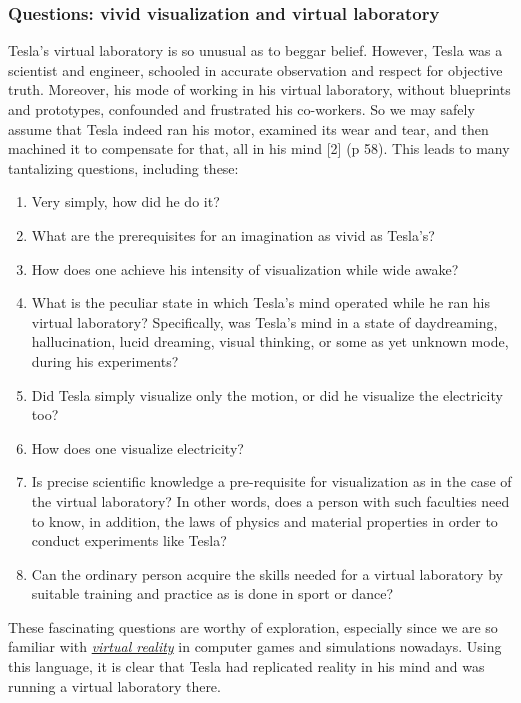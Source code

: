 \documentclass[
  11pt,
  a4paper,
]{article}
\providecommand{\tightlist}{%
  \setlength{\itemsep}{0pt}\setlength{\parskip}{0pt}}
\begin{document}
\hypertarget{questions-vivid-visualization-and-virtual-laboratory}{%
\subsubsection{Questions: vivid visualization and virtual
laboratory}\label{questions-vivid-visualization-and-virtual-laboratory}}

Tesla's virtual laboratory is so unusual as to beggar belief. However,
Tesla was a scientist and engineer, schooled in accurate observation and
respect for objective truth. Moreover, his mode of working in his
virtual laboratory, without blueprints and prototypes, confounded and
frustrated his co-workers. So we may safely assume that Tesla indeed ran
his motor, examined its wear and tear, and then machined it to
compensate for that, all in his mind {[}2{]} (p 58). This leads to many
tantalizing questions, including these:

\begin{enumerate}
\tightlist
\item
  Very simply, how did he do it?
\item
  What are the prerequisites for an imagination as vivid as Tesla's?
\item
  How does one achieve his intensity of visualization while wide awake?
\item
  What is the peculiar state in which Tesla's mind operated while he ran
  his virtual laboratory? Specifically, was Tesla's mind in a state of
  daydreaming, hallucination, lucid dreaming, visual thinking, or some
  as yet unknown mode, during his experiments?
\item
  Did Tesla simply visualize only the motion, or did he visualize the
  electricity too?
\item
  How does one visualize electricity?
\item
  Is precise scientific knowledge a pre-requisite for visualization as
  in the case of the virtual laboratory? In other words, does a person
  with such faculties need to know, in addition, the laws of physics and
  material properties in order to conduct experiments like Tesla?
\item
  Can the ordinary person acquire the skills needed for a virtual
  laboratory by suitable training and practice as is done in sport or
  dance?
\end{enumerate}

These fascinating questions are worthy of exploration, especially since
we are so familiar with
\href{https://en.wikipedia.org/wiki/Virtual_reality}{\emph{virtual
reality}} in computer games and simulations nowadays. Using this
language, it is clear that Tesla had replicated reality in his mind and
was running a virtual laboratory there.
\end{document}

